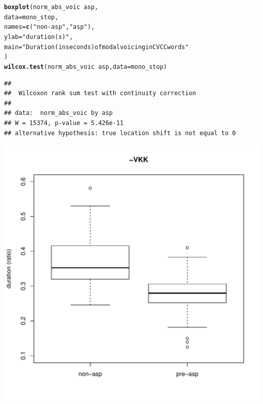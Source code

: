 \documentclass[a4paper,11pt]{article}\usepackage[]{graphicx}\usepackage[]{color}
\makeatletter
\def\maxwidth{ %
  \ifdim\Gin@nat@width>\linewidth
    \linewidth
  \else
    \Gin@nat@width
  \fi
}
\newcommand{\hlstr}[1]{\textcolor[rgb]{0.192,0.494,0.8}{#1}}%
\newcommand{\hlopt}[1]{\textcolor[rgb]{0,0,0}{#1}}%
\newcommand{\hlstd}[1]{\textcolor[rgb]{0.345,0.345,0.345}{#1}}%
\newcommand{\hlkwc}[1]{\textcolor[rgb]{0.333,0.667,0.333}{#1}}%
\newcommand{\hlkwd}[1]{\textcolor[rgb]{0.737,0.353,0.396}{\textbf{#1}}}%
\newenvironment{kframe}{%
 \def\at@end@of@kframe{}%
 \ifinner\ifhmode%
  \def\at@end@of@kframe{\end{minipage}}%
  \begin{minipage}{\columnwidth}%
 \fi\fi%
 \def\FrameCommand##1{\hskip\@totalleftmargin \hskip-\fboxsep
 \colorbox{shadecolor}{##1}\hskip-\fboxsep
     \hskip-\linewidth \hskip-\@totalleftmargin \hskip\columnwidth}%
 \MakeFramed {\advance\hsize-\width
   \@totalleftmargin\z@ \linewidth\hsize
   \@setminipage}}%
 {\par\unskip\endMakeFramed%
 \at@end@of@kframe}
\newenvironment{knitrout}{}{} %
\makeatother
\begin{document}
\begin{knitrout}
\color{fgcolor}\begin{kframe}
\begin{alltt}
\hlkwd{boxplot}\hlstd{(norm_abs_voic} \hlopt{~} \hlstd{asp,}
        \hlkwc{data} \hlstd{= mono_stop,}
        \hlkwc{names} \hlstd{=} \hlkwd{c}\hlstd{(}\hlstr{"non-asp"}\hlstd{,} \hlstr{"asp"}\hlstd{),}
        \hlkwc{ylab} \hlstd{=} \hlstr{"duration (s)"}\hlstd{,}
        \hlkwc{main} \hlstd{=} \hlstr{"Duration (in seconds) of modal voicing in CVCC words"}
        \hlstd{)}
\hlkwd{wilcox.test}\hlstd{(norm_abs_voic} \hlopt{~} \hlstd{asp,} \hlkwc{data} \hlstd{= mono_stop)}
\end{alltt}
\begin{verbatim}
## 
## 	Wilcoxon rank sum test with continuity correction
## 
## data:  norm_abs_voic by asp
## W = 15374, p-value = 5.426e-11
## alternative hypothesis: true location shift is not equal to 0
\end{verbatim}
\end{kframe}

{\centering \includegraphics[width=\maxwidth]{img/mono-stop-box-1} 

}



\end{knitrout}
\end{document}
